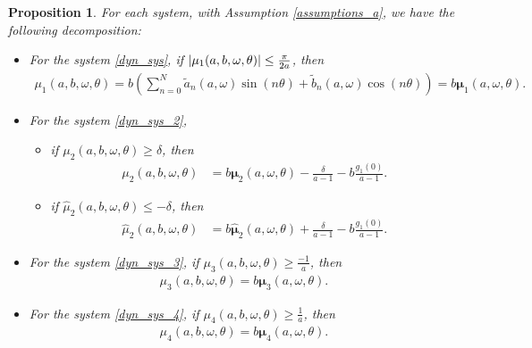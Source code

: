 \documentclass[12pt]{article}
\theoremstyle{plain}
\newtheorem{prop}[defn]{Proposition}
\theoremstyle{remark}
\DeclarePairedDelimiter\abs{\lvert}{\rvert}
\theoremstyle{definition}
\begin{document}
\begin{prop}\label{explicit_factor_mu}
    For each system, with Assumption \eqref{assumptions_a}, we have the following decomposition:
    \begin{itemize}
        \item For the system \eqref{dyn_sys}, if $\abs{\mu_1(a,b,\omega,\theta)}\leq \frac{\pi}{2a}$, then
        \begin{align*}
            \mu_1(a,b,\omega,\theta)=b\left(\sum_{n=0}^N \tilde{a}_n(a,\omega)\sin(n\theta)+\tilde{b}_n(a,\omega)\cos(n\theta)\right) = b\boldsymbol\mu_1(a,\omega,\theta).
        \end{align*}
    
        \item For the system \eqref{dyn_sys_2},
        \begin{itemize}
            \item if $\mu_2(a,b,\omega,\theta)\geq\delta$, then
            \begin{align*}
                \mu_2(a,b,\omega,\theta) &= b\boldsymbol\mu_2(a,\omega,\theta) - \frac{\delta}{a-1} - b\frac{g_1(0)}{a-1}.
            \end{align*}
            \item if $\hat\mu_2(a,b,\omega,\theta)\leq-\delta$, then
            \begin{align*}
                \hat\mu_2(a,b,\omega,\theta) &= b\boldsymbol{\hat\mu}_2(a,\omega,\theta) + \frac{\delta}{a-1} - b\frac{g_1(0)}{a-1}.
            \end{align*}
        \end{itemize}
        
        \item For the system \eqref{dyn_sys_3}, if $\mu_3(a,b,\omega,\theta)\geq \frac{-1}{a}$, then
        \begin{align*}
            \mu_3(a,b,\omega,\theta) = b\boldsymbol\mu_3(a,\omega,\theta).
        \end{align*}
    
        \item For the system \eqref{dyn_sys_4}, if $\mu_4(a,b,\omega,\theta)\geq \frac{1}{a}$, then
        \begin{align*}
            \mu_4(a,b,\omega,\theta) = b\boldsymbol\mu_4(a,\omega,\theta).
        \end{align*}
    \end{itemize}
\end{prop}
\end{document}
